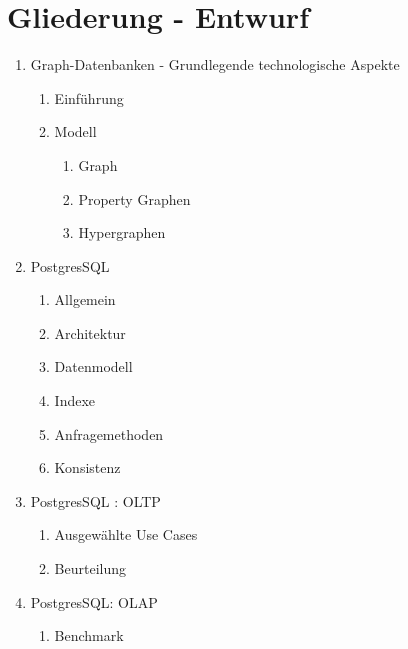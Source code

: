 \section*{Gliederung - Entwurf}
\enlargethispage*{\baselineskip}
    \begin{enumerate}
        \item Graph-Datenbanken - Grundlegende technologische Aspekte
        \begin{enumerate}[label*=\arabic*.]
            \item Einführung
            \item Modell
             \begin{enumerate}[label*=\arabic*.]
            	\item Graph
            	\item Property Graphen
            	\item Hypergraphen
            \end{enumerate}
        \end{enumerate}
        \item PostgresSQL
        \begin{enumerate}[label*=\arabic*.]
            \item Allgemein
            \item Architektur
            \item Datenmodell
            \item Indexe
            \item Anfragemethoden
            \item Konsistenz
        \end{enumerate}
        \item PostgresSQL : OLTP
            \begin{enumerate}[label*=\arabic*.]
                \item Ausgewählte Use Cases
                \item Beurteilung
            \end{enumerate}
        \item PostgresSQL: OLAP
        \begin{enumerate}[label*=\arabic*.]
            \item Benchmark
            \begin{enumerate}[label*=\arabic*.]

\end{enumerate}
\end{enumerate}
\end{enumerate}
